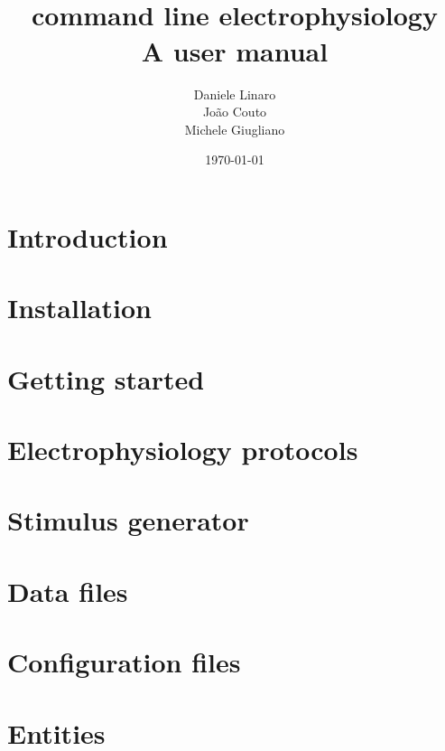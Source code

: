 \documentclass[10pt,a4paper,oneside]{book}
\title{\progname \\ command line electrophysiology \\ A user manual}
\author{Daniele Linaro \\ Jo\~ao Couto \\ Michele Giugliano}
\date{\today}
\begin{document}
\maketitle
\thispagestyle{empty}

\dominitoc
\tableofcontents
\newpage
{}

\chapter{Introduction}
\label{chap:intro}


\chapter{Installation}
\label{chap:installation}


\chapter{Getting started}
\label{chap:start}


\chapter{Electrophysiology protocols}
\label{chap:protocols}


\chapter{Stimulus generator}
\label{chap:stimgen}


\chapter{Data files}
\label{chap:datafiles}


\chapter{Configuration files}
\label{chap:configuration}


%

\chapter{Entities}
\label{chap:entities}

\end{document}
